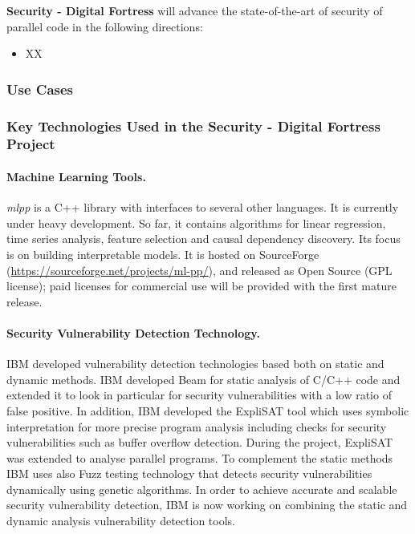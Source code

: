 \documentclass[a4paper,11pt]{article}
\newcommand{\project}[1]{\textbf{#1}\xspace}
\newcommand{\SECURITY}{\project{Security - Digital Fortress}}
\newcommand{\TheProject}{\SECURITY}
\begin{document}
\TheProject{} will advance the state-of-the-art of security of parallel code in the following directions:
\begin{itemize}
\item XX
\end{itemize}

\subsubsection{Use Cases}
\label{sect:applications}
\label{sect:background-last}

\subsubsection{Key Technologies Used in the \TheProject{} Project}
\label{sect:key-technologies}

\paragraph{\SCCHshort{} Machine Learning Tools.}
\label{sec:mlpp}
\emph{mlpp} is a C++ library with interfaces to several other languages. It 
is currently under heavy development. So far, it contains algorithms for 
linear regression, time series analysis, feature selection and causal 
dependency discovery. Its focus is on building interpretable models. It is hosted 
on SourceForge (\url{https://sourceforge.net/projects/ml-pp/}), and released 
as Open Source (GPL license); paid licenses for commercial use will be provided
with the first mature release.

\paragraph{\IBM{} Security Vulnerability Detection Technology.}

IBM developed vulnerability detection technologies based both on static and dynamic methods. IBM developed Beam for static analysis of C/C++ code and extended it to look in particular for security vulnerabilities with a low ratio of false positive. In addition, IBM developed the ExpliSAT tool which uses symbolic interpretation for more precise program analysis including checks for security vulnerabilities such as buffer overflow detection. During the \rephrase{} project, ExpliSAT was extended to analyse parallel programs. To complement the static methods IBM uses also Fuzz testing technology that detects security vulnerabilities dynamically using genetic algorithms. In order to achieve accurate and scalable security vulnerability detection, IBM is now working on combining the static and dynamic analysis vulnerability detection tools.     
\end{document}
